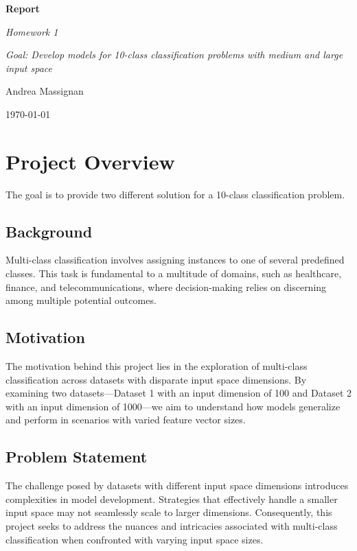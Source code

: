 \documentclass{article}
\begin{document}
\begin{titlepage}
    \centering
    \vspace*{2cm}
    {\Huge\bfseries Report\par}
    \vspace{2cm}
    {\Large\itshape Homework 1\par}
    \vspace{0.5cm}
    {\large\itshape Goal: Develop models for 10-class classification problems with medium and large input space\par}
    \vfill
    {\Large Andrea Massignan\par}
    \vfill
    {\large\today\par}
\end{titlepage}

\section*{Project Overview}

The goal is to provide two different solution for a 10-class classification problem. 

\subsection{Background}
Multi-class classification involves assigning instances to one of several predefined classes. This task is fundamental to a multitude of domains, such as healthcare, finance, and telecommunications, where decision-making relies on discerning among multiple potential outcomes.

\subsection{Motivation}
The motivation behind this project lies in the exploration of multi-class classification across datasets with disparate input space dimensions. By examining two datasets—Dataset 1 with an input dimension of 100 and Dataset 2 with an input dimension of 1000—we aim to understand how models generalize and perform in scenarios with varied feature vector sizes.

\subsection{Problem Statement}
The challenge posed by datasets with different input space dimensions introduces complexities in model development. Strategies that effectively handle a smaller input space may not seamlessly scale to larger dimensions. Consequently, this project seeks to address the nuances and intricacies associated with multi-class classification when confronted with varying input space sizes.
\end{document}
